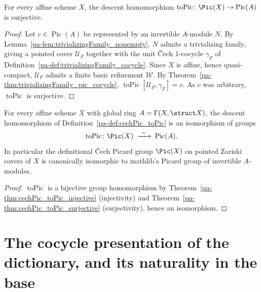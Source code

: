 \begin{theorem}
  \label{pa-thm:cechPic_toPic_surjective}
  \leanok

  For every affine scheme \(X\), the descent homomorphism \(\operatorname{toPic} \colon
  \Pic(X) \to \operatorname{Pic}(A)\) is surjective.
\end{theorem}
\begin{proof}
  \leanok
  Let \(c \in \operatorname{Pic}(A)\) be represented by an invertible \(A\)-module \(N\). By
  Lemma~\ref{pa-lem:trivializingFamily_nonempty}, \(N\) admits a trivializing family, giving a
  pointed cover \(\mathcal U_F\) together with the unit \v Cech \(1\)-cocycle \(\gamma_F\) of
  Definition~\ref{pa-def:trivializingFamily_cocycle}. Since \(X\) is affine, hence quasi-compact,
  \(\mathcal U_F\) admits a finite basic refinement \(\mathcal W\). By
  Theorem~\ref{pa-thm:trivializingFamily_pic_cocycle}, \(\operatorname{toPic}[\mathcal
  U_F,\gamma_F] = c\). As \(c\) was arbitrary, \(\operatorname{toPic}\) is surjective.
\end{proof}

\begin{theorem}
  \label{pa-thm:cechPicEquivPic}
  \leanok

  For every affine scheme \(X\) with global ring \(A = \Gamma(X,\struct X)\), the descent
  homomorphism of Definition~\ref{pa-def:cechPic_toPic} is an isomorphism of groups
  \[
    \operatorname{toPic} \colon \Pic(X) \;\xrightarrow{\ \sim\ }\; \operatorname{Pic}(A).
  \]
  In particular the definitional \v Cech Picard group \(\Pic(X)\) on pointed Zariski covers of
  \(X\) is canonically isomorphic to mathlib's Picard group of invertible \(A\)-modules.
\end{theorem}
\begin{proof}
  \leanok
  \(\operatorname{toPic}\) is a bijective group homomorphism by
  Theorem~\ref{pa-thm:cechPic_toPic_injective} (injectivity) and
  Theorem~\ref{pa-thm:cechPic_toPic_surjective} (surjectivity), hence an isomorphism.
\end{proof}

\section{The cocycle presentation of the dictionary, and its naturality in the base}

